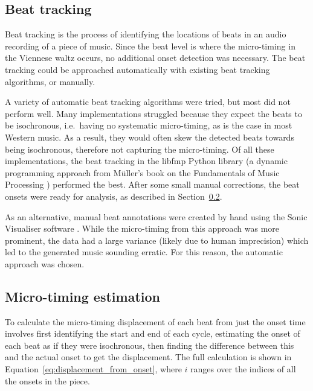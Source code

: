 \documentclass[12pt,twoside,openright]{report}
\begin{document}
\subsection{Beat tracking} \label{beat_tracking}

Beat tracking is the process of identifying the locations of beats in an audio
recording of a piece of music. Since the beat level is where the micro-timing in
the Viennese waltz occurs, no additional onset detection was necessary. The beat
tracking could be approached automatically with existing beat tracking
algorithms, or manually.

A variety of automatic beat tracking algorithms were tried, but most did not
perform well. Many implementations struggled because they expect the beats to be
isochronous, i.e.\ having no systematic micro-timing, as is the case in most
Western music. As a result, they would often skew the detected beats towards
being isochronous, therefore not capturing the micro-timing. Of all these
implementations, the beat tracking in the libfmp Python library \cite{mueller2021} (a
dynamic programming approach from Müller's book on the Fundamentals of Music Processing
\cite{mueller2021b}) performed the best. After some
small manual corrections, the beat onsets were ready for analysis, as described
in Section~\ref{waltz_micro-timing}.

As an alternative, manual beat annotations were created by hand using the Sonic
Visualiser software \cite{cannam2010}. While the micro-timing from this approach was
more prominent, the data had a large variance (likely due to human imprecision) which led to the generated music sounding erratic. For this reason, the automatic approach was chosen.


\subsection{Micro-timing estimation} \label{waltz_micro-timing}

To calculate the micro-timing displacement of each beat from just the onset time
involves first identifying the start and end of each cycle, estimating the onset
of each beat as if they were isochronous, then finding the difference between this
and the actual onset to get the displacement. The full calculation is shown in
Equation~\ref{eq:displacement_from_onset}, where $i$ ranges over the indices of all the onsets in the piece.
\end{document}
